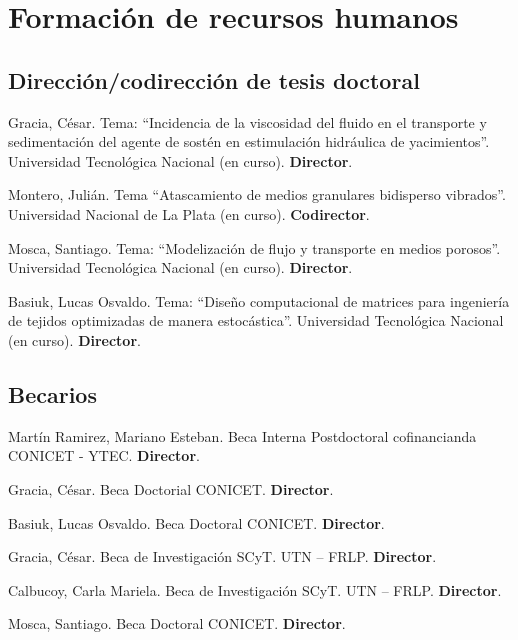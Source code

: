 \section{Formación de recursos humanos}

\subsection{Dirección/codirección de tesis doctoral}

 Gracia, César. Tema: ``Incidencia de la viscosidad del fluido en el transporte y sedimentación del agente de sostén en estimulación hidráulica de yacimientos''. Universidad Tecnológica Nacional (en curso). \textbf{Director}.

 Montero, Julián. Tema ``Atascamiento de medios granulares bidisperso vibrados''. Universidad Nacional de La Plata (en curso). \textbf{Codirector}.

 Mosca, Santiago. Tema: ``Modelización de flujo y transporte en medios porosos''. Universidad Tecnológica Nacional (en curso). \textbf{Director}.

 Basiuk, Lucas Osvaldo. Tema: ``Diseño computacional de matrices para ingeniería de tejidos optimizadas de manera estocástica''. Universidad Tecnológica Nacional  (en curso). \textbf{Director}.

\subsection{Becarios}
     Martín Ramirez, Mariano Esteban. Beca Interna Postdoctoral cofinancianda CONICET - YTEC. \textbf{Director}.

     Gracia, César. Beca Doctorial CONICET. \textbf{Director}.

     Basiuk, Lucas Osvaldo. Beca Doctoral CONICET. \textbf{Director}.

     Gracia, César. Beca de Investigación SCyT. UTN -- FRLP. \textbf{Director}.

     Calbucoy, Carla Mariela. Beca de Investigación SCyT. UTN -- FRLP. \textbf{Director}.

     Mosca, Santiago. Beca Doctoral CONICET. \textbf{Director}.

